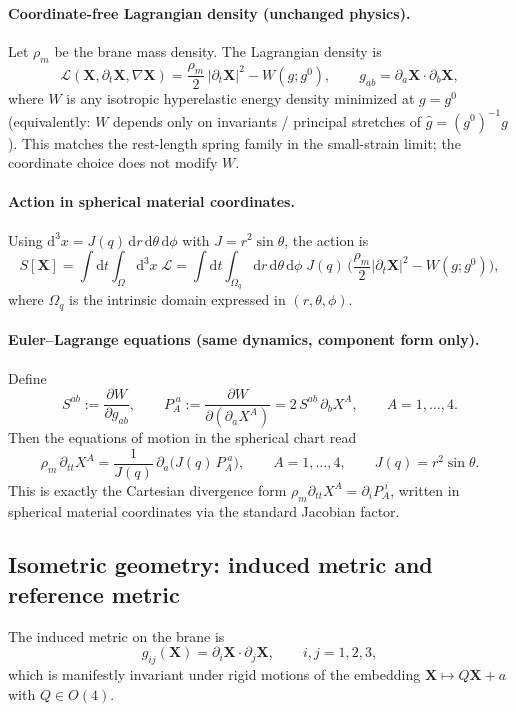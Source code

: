 \documentclass[11pt,a4paper]{article}
\providecommand{\dd}{\mathrm{d}}
\newcommand{\X}{\mathbf{X}}                 %
\newcommand{\Lag}{\mathcal{L}}              %
\begin{document}
\paragraph{Coordinate-free Lagrangian density (unchanged physics).}
Let \(\rho_m\) be the brane mass density. The Lagrangian density is
\[
\Lag(\X,\partial_t\X,\nabla\X)=\frac{\rho_m}{2}\,|\partial_t\X|^2 - W(g;g^0),
\qquad
g_{ab}=\partial_a\X\cdot\partial_b\X,
\]
where \(W\) is any isotropic hyperelastic energy density minimized at \(g=g^0\)
(equivalently: \(W\) depends only on invariants / principal stretches of
\(\widehat g=(g^0)^{-1}g\)). This matches the rest-length spring family in the
small-strain limit; the coordinate choice does not modify \(W\).

\paragraph{Action in spherical material coordinates.}
Using \(\dd^3x = J(q)\,\dd r\,\dd\theta\,\dd\phi\) with \(J=r^2\sin\theta\), the action is
\[
S[\X]=\int \dd t\int_{\Omega}\dd^3x\;\Lag
=\int \dd t\int_{\Omega_q}\dd r\,\dd\theta\,\dd\phi\; J(q)\,
\Big(\frac{\rho_m}{2}|\partial_t\X|^2 - W(g;g^0)\Big),
\]
where \(\Omega_q\) is the intrinsic domain expressed in \((r,\theta,\phi)\).

\paragraph{Euler--Lagrange equations (same dynamics, component form only).}
Define
\[
S^{ab}:=\frac{\partial W}{\partial g_{ab}},
\qquad
P_A^{\;a}:=\frac{\partial W}{\partial(\partial_a X^A)} = 2\,S^{ab}\,\partial_b X^A,
\qquad A=1,\dots,4.
\]
Then the equations of motion in the spherical chart read
\[
\rho_m\,\partial_{tt}X^A
=\frac{1}{J(q)}\,\partial_a\!\Big(J(q)\,P_A^{\;a}\Big),
\qquad A=1,\dots,4,
\qquad J(q)=r^2\sin\theta.
\]
This is exactly the Cartesian divergence form \(\rho_m \partial_{tt}X^A=\partial_i P_A^{\;i}\),
written in spherical material coordinates via the standard Jacobian factor.

\subsection{Isometric geometry: induced metric and reference metric}
The induced metric on the brane is
\begin{equation}
  g_{ij}(\mathbf{X})=\partial_i\mathbf{X}\cdot\partial_j\mathbf{X},
  \qquad i,j=1,2,3,
  \label{eq:induced_metric}
\end{equation}
which is manifestly invariant under rigid motions of the embedding
$\mathbf{X}\mapsto Q\mathbf{X}+a$ with $Q\in O(4)$.
\end{document}
